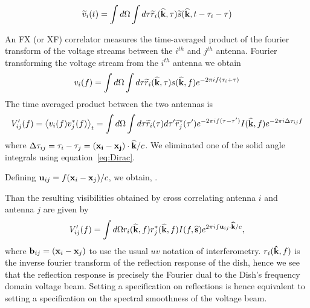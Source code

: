 \documentclass[onecolumn]{emulateapj}
\begin{document}
\begin{equation}
\widetilde{v}_i(t) = \int d \Omega \int d \tau \widetilde{r}_i({\bf \widehat{k}},\tau) \widetilde{s}({\bf \widehat{k}},t- \tau_i - \tau)
\end{equation}

 An FX (or XF) correlator measures the time-averaged product of the fourier transform of the voltage streams between the $i^{th}$ and $j^{th}$ antenna. Fourier transforming the voltage stream from the $i^{th}$ antenna we obtain
\begin{equation}
v_i(f) = \int d \Omega \int d \tau \widetilde{r}_i({\bf \widehat{k}},\tau) s({\bf \widehat{k}},f)e^{-2 \pi i f(\tau_i+\tau)}
\end{equation}
The time averaged product between the two antennas is
\begin{equation}
V_{ij}'(f) = \left \langle v_i(f) v_j^*(f) \right \rangle_t = \int d \Omega \int d \tau \widetilde{r}_i(\tau) d \tau' \widetilde{r}^*_j(\tau')e^{-2 \pi i f (\tau-\tau') } I({\bf \widehat{k}}, f) e^{- 2 \pi i \Delta \tau_{ij}f} 
\end{equation}
where $\Delta \tau_{ij} = \tau_i-\tau_j = ({\bf x_i - x_j}) \cdot {\bf \widehat{k}}/c$. We eliminated one of the solid angle integrals using equation~\ref{eq:Dirac}. 

Defining ${\bf u}_{ij} = f ({\bf x}_i-{\bf x}_j)/c$, we obtain,
.

 
 

Than the resulting visibilities obtained by cross correlating antenna $i$ and antenna $j$ are given by 
\begin{equation}\label{eq:Visibility}
V'_{ij}(f) =  \int d \Omega r_i({\bf \widehat{k}},f) r^*_j({\bf \widehat{k}},f)  I(f,{\bf \widehat{s}})e^{2 \pi i f {\bf u}_{ij} \cdot {\bf \widehat{k}}/c},
\end{equation}
where ${\bf b}_{ij} = ({\bf x}_i - {\bf x}_j )$ to use the usual $uv$ notation of interferometry. $r_i({\bf \hat{k}},f)$ is the inverse fourier transform of the reflection response of the dish, hence we see that the reflection response is precisely the Fourier dual to the Dish's frequency domain voltage beam. Setting a specification on reflections is hence equivalent to setting a specification on the spectral smoothness of the voltage beam. 
\end{document}

